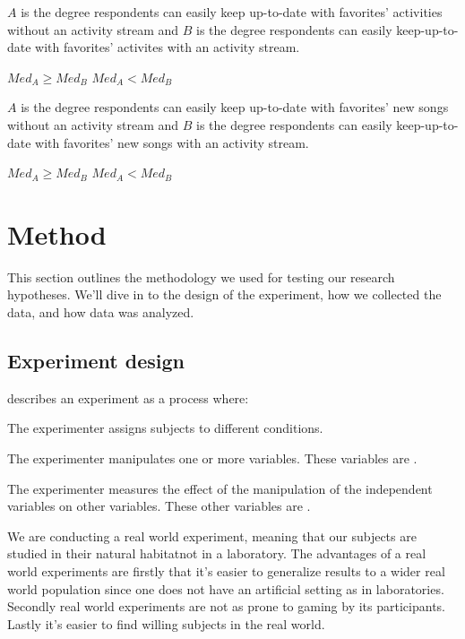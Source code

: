 $A$ is the degree respondents can easily keep up-to-date with
favorites' activities without an activity stream and $B$ is the degree
respondents can easily keep-up-to-date with favorites' activites  with
an activity stream.
\begin{items}
   $Med_A \geq Med_B$
   $Med_A < Med_B$
\end{items}

$A$ is the degree respondents can easily keep up-to-date with
favorites' new songs without an activity stream and $B$ is the degree
respondents can easily keep-up-to-date with favorites' new songs with
an activity stream.
\begin{items}
   $Med_A \geq Med_B$
   $Med_A < Med_B$
\end{items}

\section{Method}
\label{section:empirical.methodology}

This section outlines the methodology we used for testing our research
hypotheses. We'll dive in to the design of the experiment, how we collected
the data, and how data was analyzed.

\subsection{Experiment design}
\label{section:empirical.methodology.experiment.design}

\citet[]{robson93} describes an experiment as a process where:


\begin{items}
  \item The experimenter assigns subjects to different conditions.
  \item The experimenter manipulates one or more variables.
    These variables are .
  \item The experimenter measures the effect of the manipulation of
    the independent variables on other variables. These other
    variables are .
\end{items}

We are conducting a real world experiment, meaning that our subjects
are studied in their natural habitat\dash{}not in a laboratory.
The advantages of a real world experiments are firstly that it's easier to
generalize results to a wider real world population since one does not have
an artificial setting as in laboratories. Secondly real world experiments are
not as prone to gaming by its participants. Lastly it's easier to find willing
subjects in the real world.

